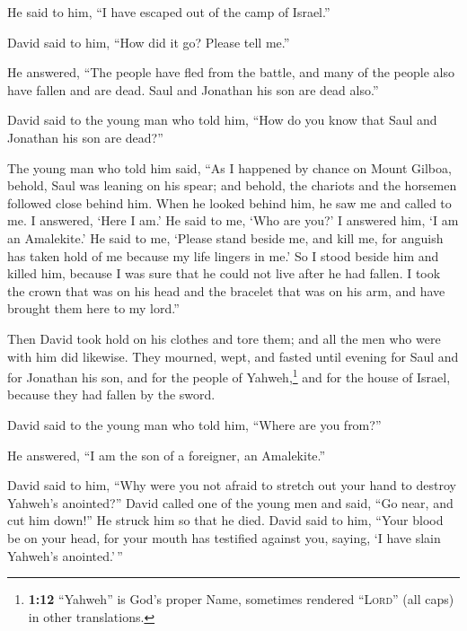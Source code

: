 \begin{paracol}{2}
\begin{otherlanguage}{english}
He said to him, ``I have escaped out of the camp of Israel.''

 David said to him, ``How did it go? Please tell me.''

He answered, ``The people have fled from the battle, and many of the
people also have fallen and are dead. Saul and Jonathan his son are dead
also.''

 David said to the young man who told him, ``How do you
know that Saul and Jonathan his son are dead?''

 The young man who told him said, ``As I happened by
chance on Mount Gilboa, behold, Saul was leaning on his spear; and
behold, the chariots and the horsemen followed close behind him.
 When he looked behind him, he saw me and called to me. I
answered, `Here I am.'  He said to me, `Who are you?' I
answered him, `I am an Amalekite.'  He said to me, `Please
stand beside me, and kill me, for anguish has taken hold of me because
my life lingers in me.'  So I stood beside him and killed
him, because I was sure that he could not live after he had fallen. I
took the crown that was on his head and the bracelet that was on his
arm, and have brought them here to my lord.''

 Then David took hold on his clothes and tore them; and
all the men who were with him did likewise.  They
mourned, wept, and fasted until evening for Saul and for Jonathan his
son, and for the people of Yahweh,\footnote{\textbf{1:12} ``Yahweh'' is
  God's proper Name, sometimes rendered ``\textsc{Lord}'' (all caps) in
  other translations.} and for the house of Israel, because they had
fallen by the sword.

 David said to the young man who told him, ``Where are
you from?''

He answered, ``I am the son of a foreigner, an Amalekite.''

 David said to him, ``Why were you not afraid to stretch
out your hand to destroy Yahweh's anointed?''  David
called one of the young men and said, ``Go near, and cut him down!'' He
struck him so that he died.  David said to him, ``Your
blood be on your head, for your mouth has testified against you, saying,
`I have slain Yahweh's anointed.'\,''


\end{otherlanguage}
\end{paracol}
